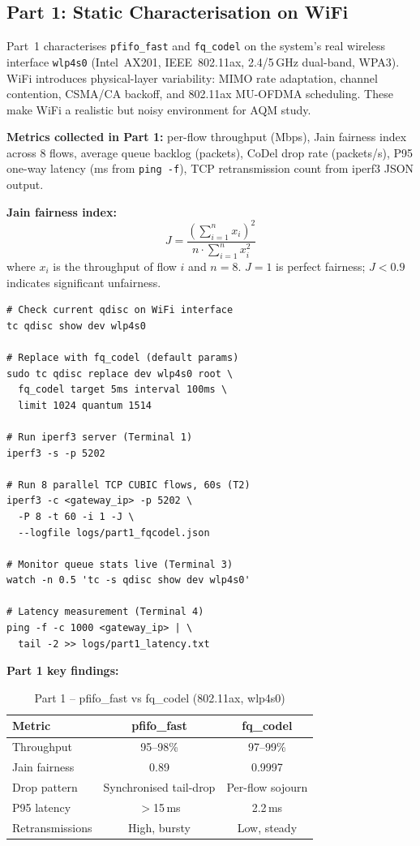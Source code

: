 \documentclass[conference]{IEEEtran}
\begin{document}
\subsection{Part 1: Static Characterisation on WiFi}

Part~1 characterises \texttt{pfifo\_fast} and \texttt{fq\_codel} on the system's
real wireless interface \texttt{wlp4s0} (Intel~AX201, IEEE~802.11ax, 2.4/5\,GHz
dual-band, WPA3). WiFi introduces physical-layer variability: MIMO rate
adaptation, channel contention, CSMA/CA backoff, and 802.11ax MU-OFDMA
scheduling. These make WiFi a realistic but noisy environment for AQM study.

\textbf{Metrics collected in Part 1:} per-flow throughput (Mbps), Jain fairness
index~\cite{jain1984} across 8 flows, average queue backlog (packets), CoDel
drop rate (packets/s), P95 one-way latency (ms from \texttt{ping -f}), TCP
retransmission count from iperf3 JSON output.

\textbf{Jain fairness index:}
\begin{equation}
J = \frac{\left(\sum_{i=1}^{n} x_i\right)^2}{n \cdot \sum_{i=1}^{n} x_i^2}
\label{eq:jain}
\end{equation}
where $x_i$ is the throughput of flow $i$ and $n=8$. $J=1$ is perfect fairness;
$J<0.9$ indicates significant unfairness.

\begin{lstlisting}[caption=Part 1 WiFi queue setup and measurement]
# Check current qdisc on WiFi interface
tc qdisc show dev wlp4s0

# Replace with fq_codel (default params)
sudo tc qdisc replace dev wlp4s0 root \
  fq_codel target 5ms interval 100ms \
  limit 1024 quantum 1514

# Run iperf3 server (Terminal 1)
iperf3 -s -p 5202

# Run 8 parallel TCP CUBIC flows, 60s (T2)
iperf3 -c <gateway_ip> -p 5202 \
  -P 8 -t 60 -i 1 -J \
  --logfile logs/part1_fqcodel.json

# Monitor queue stats live (Terminal 3)
watch -n 0.5 'tc -s qdisc show dev wlp4s0'

# Latency measurement (Terminal 4)
ping -f -c 1000 <gateway_ip> | \
  tail -2 >> logs/part1_latency.txt
\end{lstlisting}

\textbf{Part 1 key findings:}

\begin{table}[h]
\centering
\caption{Part 1 -- pfifo\_fast vs fq\_codel (802.11ax, wlp4s0)}
\label{tab:part1}
\scriptsize
\begin{tabular}{lcc}
\toprule
\textbf{Metric} & \textbf{pfifo\_fast} & \textbf{fq\_codel} \\
\midrule
Throughput     & 95--98\% & 97--99\% \\
Jain fairness  & 0.89     & 0.9997   \\
Drop pattern   & Synchronised tail-drop & Per-flow sojourn \\
P95 latency    & $>$15\,ms & 2.2\,ms \\
Retransmissions& High, bursty & Low, steady \\
\bottomrule
\end{tabular}
\end{table}
\end{document}
